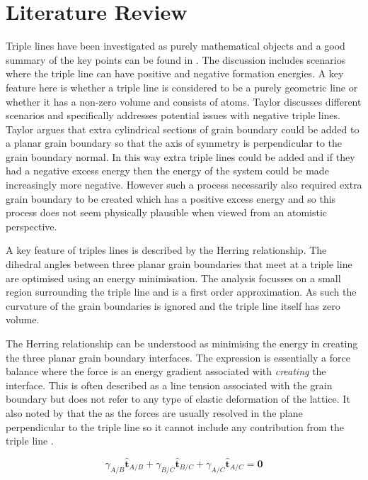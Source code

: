 \documentclass[12pt,a4paper]{book}
\begin{document}
\chapter{Literature Review} \label{ch:lr}

 
Triple lines have been investigated as purely mathematical objects and a good summary of the key points can be found in \cite{Taylor1999}. The discussion includes scenarios where the triple line can have positive and negative formation energies. A key feature here is whether a triple line is considered to be a purely geometric line or whether it has a non-zero volume and consists of atoms. Taylor discusses different scenarios and specifically addresses potential issues with negative triple lines. Taylor argues that extra cylindrical sections of grain boundary could be added to a planar grain boundary so that the axis of symmetry is perpendicular to the grain boundary normal. In this way extra triple lines could be added and if they had a negative excess energy then the energy of the system could be made increasingly more negative. However such a process necessarily also required extra grain boundary to be created which has a positive excess energy and so this process does not seem physically plausible when viewed from an atomistic perspective.

A key feature of triples lines is described by the Herring relationship. The dihedral angles between three planar grain boundaries that meet at a triple line are optimised using an energy minimisation. The analysis focusses on a small region surrounding the triple line and is a first order approximation. As such the curvature of the grain boundaries is ignored and the triple line itself has zero volume. 

The Herring relationship can be understood as minimising the energy in creating the three planar grain boundary interfaces. The expression is essentially a force balance where the force is an energy gradient associated with \emph{creating} the interface. This is often described as a line tension associated with the grain boundary but does not refer to any type of elastic deformation of the lattice. It also noted by \citeauthor{CRAIGCARTER} that the as the forces are usually resolved in the plane perpendicular to the triple line so it cannot include any contribution from the triple line \cite{CRAIGCARTER}. 
     
\[\gamma_{A/B}\mathbf{\hat{t}}_{A/B} + \gamma_{B/C}\mathbf{\hat{t}}_{B/C} + \gamma_{A/C}\mathbf{\hat{t}}_{A/C} =\mathbf{0} \]
\end{document}
